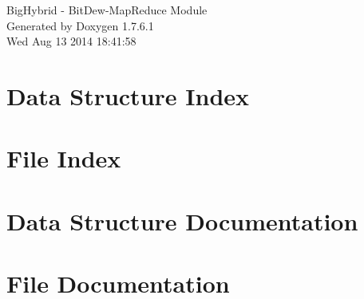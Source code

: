 \documentclass[a4paper]{book}
\begin{document}
\hypersetup{pageanchor=false,citecolor=blue}
\begin{titlepage}
\vspace*{7cm}
\begin{center}
{\Large \-Big\-Hybrid -\/ \-Bit\-Dew-\/\-Map\-Reduce \-Module }\\
\vspace*{1cm}
{\large \-Generated by Doxygen 1.7.6.1}\\
\vspace*{0.5cm}
{\small Wed Aug 13 2014 18:41:58}\\
\end{center}
\end{titlepage}
\clearemptydoublepage
{}
\tableofcontents
\clearemptydoublepage
{}
\hypersetup{pageanchor=true,citecolor=blue}
\chapter{\-Data \-Structure \-Index}

\chapter{\-File \-Index}

\chapter{\-Data \-Structure \-Documentation}







\chapter{\-File \-Documentation}












\printindex
\end{document}
